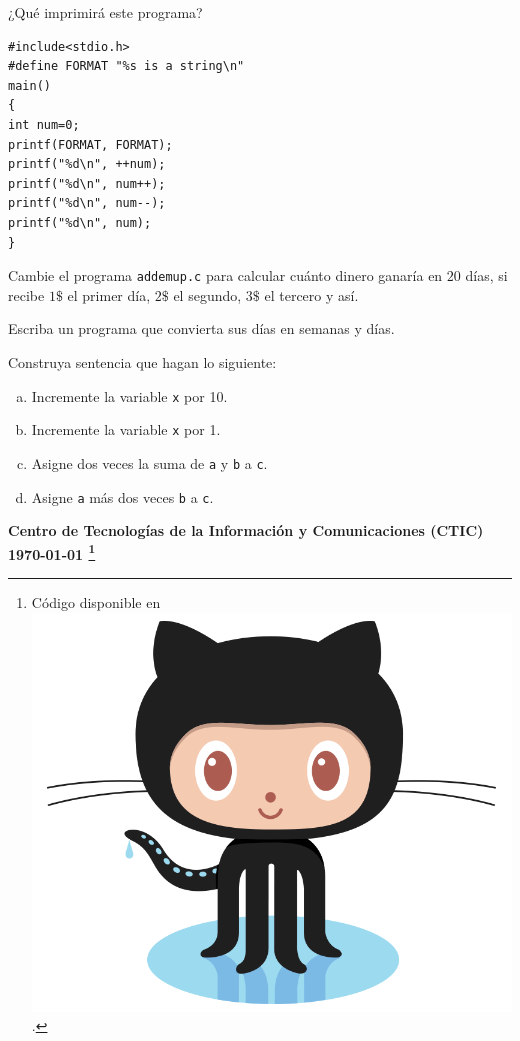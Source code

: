 \documentclass[spanish,addpoints,answers,a4paper]{exam}
\newcommand{\unmarkedfntext}[1]{%
	\begingroup
	\renewcommand\thefootnote{}\footnote{#1}%
	\addtocounter{footnote}{-1}%
	\endgroup
}
\newcommand{\mychar}{%
	\begingroup\normalfont
	\includegraphics[height=\fontcharht\font`\B]{Octocat.png}%
	\endgroup
}
\begin{document}
\begin{questions}
\question ¿Qué imprimirá este programa?

\begin{verbatim}
#include<stdio.h>
#define FORMAT "%s is a string\n"
main()
{
int num=0;
printf(FORMAT, FORMAT);
printf("%d\n", ++num);
printf("%d\n", num++);
printf("%d\n", num--);
printf("%d\n", num);
}
\end{verbatim}

\question Cambie el programa \texttt{addemup.c} para calcular cuánto dinero ganaría en $20$ días, si recibe $1\$$ el primer día, $2\$$ el segundo, $3\$$ el tercero y así.

\question Escriba un programa que convierta sus días en semanas y días.

\question Construya sentencia que hagan lo siguiente:

\begin{enumerate}[a.]
	\item Incremente la variable \texttt{x} por 10.
	\item Incremente la variable \texttt{x} por 1.
	\item Asigne dos veces la suma de \texttt{a} y \texttt{b} a \texttt{c}.
	\item Asigne \texttt{a} más dos veces \texttt{b} a \texttt{c}.
\end{enumerate}

\end{questions}

\begin{flushright}\bfseries
Centro de Tecnologías de la Información y Comunicaciones (CTIC)\\[2mm]
\today\unmarkedfntext{Código disponible en \href{https://github.com/carlosal1015/C-Programming}{\mychar{}}.}
\end{flushright}
\end{document}
